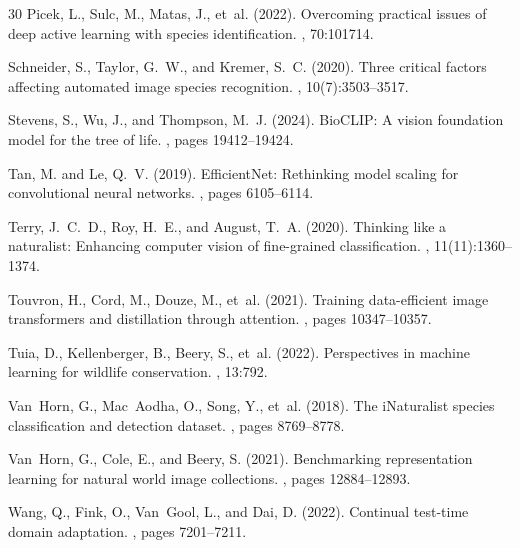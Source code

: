 \documentclass[11pt,a4paper]{article}
\begin{document}
\begin{thebibliography}{30}
Picek, L., Sulc, M., Matas, J., et~al. (2022).
\newblock Overcoming practical issues of deep active learning with species identification.
, 70:101714.

Schneider, S., Taylor, G.~W., and Kremer, S.~C. (2020).
\newblock Three critical factors affecting automated image species recognition.
, 10(7):3503--3517.

Stevens, S., Wu, J., and Thompson, M.~J. (2024).
\newblock BioCLIP: A vision foundation model for the tree of life.
, pages 19412--19424.

Tan, M. and Le, Q.~V. (2019).
\newblock EfficientNet: Rethinking model scaling for convolutional neural networks.
, pages 6105--6114.

Terry, J.~C.~D., Roy, H.~E., and August, T.~A. (2020).
\newblock Thinking like a naturalist: Enhancing computer vision of fine-grained classification.
, 11(11):1360--1374.

Touvron, H., Cord, M., Douze, M., et~al. (2021).
\newblock Training data-efficient image transformers and distillation through attention.
, pages 10347--10357.

Tuia, D., Kellenberger, B., Beery, S., et~al. (2022).
\newblock Perspectives in machine learning for wildlife conservation.
, 13:792.

Van~Horn, G., Mac~Aodha, O., Song, Y., et~al. (2018).
\newblock The iNaturalist species classification and detection dataset.
, pages 8769--8778.

Van~Horn, G., Cole, E., and Beery, S. (2021).
\newblock Benchmarking representation learning for natural world image collections.
, pages 12884--12893.

Wang, Q., Fink, O., Van~Gool, L., and Dai, D. (2022).
\newblock Continual test-time domain adaptation.
, pages 7201--7211.


\end{thebibliography}
\end{document}
